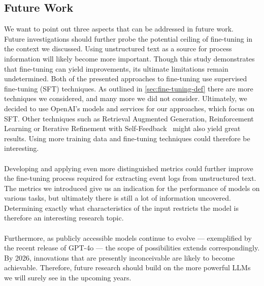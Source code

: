 \subsection{Future Work}\label{sec:future_work}
We want to point out three aspects that can be addressed in future work.\\
Future investigations should further probe the potential ceiling of fine-tuning in the context we discussed. Using unstructured text as a source for process information will likely become more important. Though this study demonstrates that fine-tuning can yield improvements, its ultimate limitations remain undetermined. Both of the presented approaches to fine-tuning use supervised fine-tuning (SFT) techniques. As outlined in \autoref{sec:fine-tuning-def} there are more techniques we considered, and many more we did not consider. Ultimately, we decided to use OpenAI's models and services for our approaches, which focus on SFT. Other techniques such as Retrieval Augmented Generation, Reinforcement Learning\cite{ovadia_fine-tuning_2024} or Iterative Refinement with Self-Feedback~\cite{madaan_self-refine_2023} might also yield great results. 
Using more training data and fine-tuning techniques could therefore be interesting.\\\\
Developing and applying even more distinguished metrics could further improve the fine-tuning process required for extracting event logs from unstructured text. The metrics we introduced give us an indication for the performance of models on various tasks, but ultimately there is still a lot of information uncovered. Determining exactly what characteristics of the input restricts the model is therefore an interesting research topic.\\\\
Furthermore, as publicly accessible models continue to evolve — exemplified by the recent release of GPT-4o — the scope of possibilities extends correspondingly. By 2026, innovations that are presently inconceivable are likely to become achievable. Therefore, future research should build on the more powerful LLMs we will surely see in the upcoming years.

